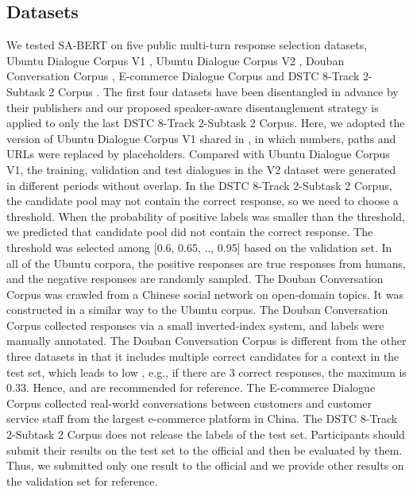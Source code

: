 \documentclass[sigconf]{acmart}
\begin{document}
  \subsection{Datasets}  \label{sec4}

    We tested SA-BERT on five public multi-turn response selection datasets, Ubuntu Dialogue Corpus V1 \cite{DBLP:conf/sigdial/LowePSP15}, Ubuntu Dialogue Corpus V2 \cite{DBLP:journals/dad/LowePSCLP17}, Douban Conversation Corpus \cite{DBLP:conf/acl/WuWXZL17}, E-commerce Dialogue Corpus \cite{DBLP:conf/coling/ZhangLZZL18} and DSTC 8-Track 2-Subtask 2 Corpus \cite{DBLP:journals/corr/abs-1911-06394}.
    The first four datasets have been disentangled in advance by their publishers and our proposed speaker-aware disentanglement strategy is applied to only the last DSTC 8-Track 2-Subtask 2 Corpus. 
    Here, we adopted the version of Ubuntu Dialogue Corpus V1 shared in \citet{DBLP:journals/corr/XuLWSW16}, in which numbers, paths and URLs were replaced by placeholders. 
Compared with Ubuntu Dialogue Corpus V1, the training, validation and test dialogues in the V2 dataset were generated in different periods without overlap. In the DSTC 8-Track 2-Subtask 2 Corpus, the candidate pool may not contain the correct response, so we need to choose a threshold.
    When the probability of positive labels was smaller than the threshold, we predicted that candidate pool did not contain the correct response.
    The threshold was selected among [0.6, 0.65, .., 0.95] based on the validation set.
    In all of the Ubuntu corpora, the positive responses are true responses from humans, and the negative responses are randomly sampled.
    The Douban Conversation Corpus was crawled from a Chinese social network on open-domain topics.
    It was constructed in a similar way to the Ubuntu corpus.
    The Douban Conversation Corpus collected responses via a small inverted-index system, and labels were manually annotated.
    The Douban Conversation Corpus is different from the other three datasets in that it includes multiple correct candidates for a context in the test set, which leads to low , e.g., if there are 3 correct responses, the maximum  is 0.33.
    Hence,  and  are recommended for reference.
    The E-commerce Dialogue Corpus collected real-world conversations between customers and customer service staff from the largest e-commerce platform in China.
    The DSTC 8-Track 2-Subtask 2 Corpus does not release the labels of the test set.
    Participants should submit their results on the test set to the official and then be evaluated by them.
    Thus, we submitted only one result to the official and we provide other results on the validation set for reference.
\end{document}
